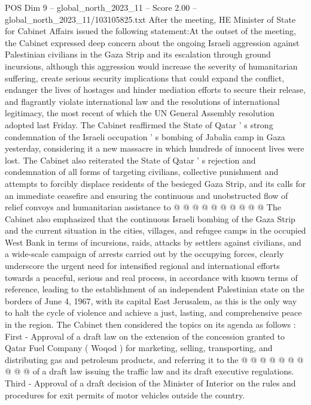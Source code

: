 \begin{textsample}{POS Dim 9 – global\_north\_2023\_11 – Score 2.00 – global\_north\_2023\_11/103105825.txt}  \label{ex:f9_pos_376}
After the meeting, HE Minister of State for Cabinet Affairs issued the following statement:At the outset of the meeting, the Cabinet expressed deep concern about the ongoing Israeli aggression against Palestinian civilians in the Gaza Strip and its escalation through ground incursions, although this aggression would increase the severity of humanitarian suffering, create serious security implications that could expand the conflict, endanger the lives of hostages and hinder mediation efforts to secure their release, and flagrantly violate international law and the resolutions of international legitimacy, the most recent of which the UN General Assembly resolution adopted last Friday.
The Cabinet reaffirmed the State of Qatar ' s strong condemnation of the Israeli occupation ' s bombing of Jabalia camp in Gaza yesterday, considering it a new massacre in which hundreds of innocent lives were lost.
The Cabinet also reiterated the State of Qatar ' s rejection and condemnation of all forms of targeting civilians, collective punishment and attempts to forcibly displace residents of the besieged Gaza Strip, and its calls for an immediate ceasefire and ensuring the continuous and unobstructed flow of relief convoys and humanitarian assistance to @ @ @ @ @ @ @ @ @ @ The Cabinet also emphasized that the continuous Israeli bombing of the Gaza Strip and the current situation in the cities, villages, and refugee camps in the occupied West Bank in terms of incursions, raids, attacks by settlers against civilians, and a wide-scale campaign of arrests carried out by the occupying forces, clearly underscore the urgent need for intensified regional and international efforts towards a peaceful, serious and real process, in accordance with known terms of reference, leading to the establishment of an independent Palestinian state on the borders of June 4, 1967, with its capital East Jerusalem, as this is the only way to halt the cycle of violence and achieve a just, lasting, and comprehensive peace in the region.
The Cabinet then considered the topics on its agenda as follows : First - Approval of a draft law on the extension of the concession granted to Qatar Fuel Company ( Woqod ) for marketing, selling, transporting, and distributing gas and petroleum products, and referring it to the @ @ @ @ @ @ @ @ @ @ of a draft law issuing the traffic law and its draft executive regulations.
Third - Approval of a draft decision of the Minister of Interior on the rules and procedures for exit permits of motor vehicles outside the country.

\end{textsample}
